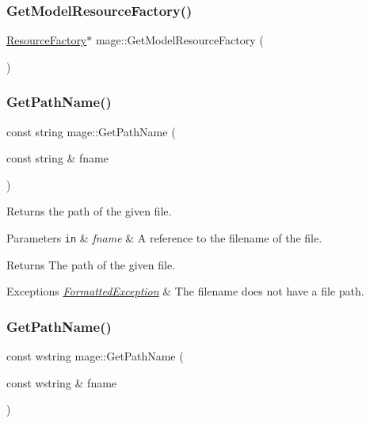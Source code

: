 \subsubsection{\texorpdfstring{Get\+Model\+Resource\+Factory()}{GetModelResourceFactory()}}
{\footnotesize\ttfamily \hyperlink{classmage_1_1_resource_factory}{Resource\+Factory}$\ast$ mage\+::\+Get\+Model\+Resource\+Factory (\begin{DoxyParamCaption}{ }\end{DoxyParamCaption})}

\hypertarget{namespacemage_ab3642c6ef6cf94a62fb37b40c3c2f57e}{}\label{namespacemage_ab3642c6ef6cf94a62fb37b40c3c2f57e} 
\subsubsection{\texorpdfstring{Get\+Path\+Name()}{GetPathName()}\hspace{0.1cm}{\footnotesize\ttfamily [1/2]}}
{\footnotesize\ttfamily const string mage\+::\+Get\+Path\+Name (\begin{DoxyParamCaption}\item[{const string \&}]{fname }\end{DoxyParamCaption})}

Returns the path of the given file.


\begin{DoxyParams}[1]{Parameters}
\mbox{\tt in}  & {\em fname} & A reference to the filename of the file. \\
\hline
\end{DoxyParams}
\begin{DoxyReturn}{Returns}
The path of the given file. 
\end{DoxyReturn}

\begin{DoxyExceptions}{Exceptions}
{\em \hyperlink{structmage_1_1_formatted_exception}{Formatted\+Exception}} & The filename does not have a file path. \\
\hline
\end{DoxyExceptions}
\hypertarget{namespacemage_ad23faa6d1854d389eb37fbdeefe97361}{}\label{namespacemage_ad23faa6d1854d389eb37fbdeefe97361} 
\subsubsection{\texorpdfstring{Get\+Path\+Name()}{GetPathName()}\hspace{0.1cm}{\footnotesize\ttfamily [2/2]}}
{\footnotesize\ttfamily const wstring mage\+::\+Get\+Path\+Name (\begin{DoxyParamCaption}\item[{const wstring \&}]{fname }\end{DoxyParamCaption})}

